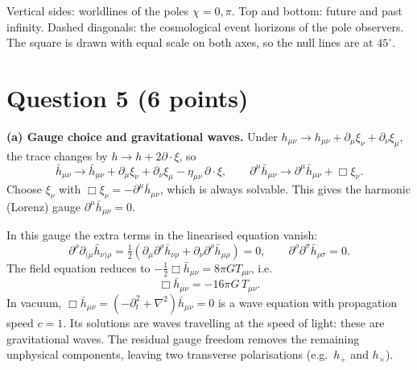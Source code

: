\documentclass[12pt]{article}
\newcommand{\bh}{\bar{h}}
\begin{document}
\begin{center}
\end{center}

\noindent Vertical sides: worldlines of the poles $\chi=0,\pi$. Top and bottom: future and past infinity. Dashed diagonals: the cosmological event horizons of the pole observers. The square is drawn with equal scale on both axes, so the null lines are at $45^\circ$.

\section*{Question 5 (6 points)}

\textbf{(a) Gauge choice and gravitational waves.} Under $h_{\mu\nu}\to h_{\mu\nu}+\partial_\mu\xi_\nu+\partial_\nu\xi_\mu$, the trace changes by $h\to h+2\partial\cdot\xi$, so
\[
\bh_{\mu\nu}\to\bh_{\mu\nu}+\partial_\mu\xi_\nu+\partial_\nu\xi_\mu-\eta_{\mu\nu}\,\partial\cdot\xi,
\qquad
\partial^\mu\bh_{\mu\nu}\to\partial^\mu\bh_{\mu\nu}+\Box\xi_\nu .
\]
Choose $\xi_\nu$ with $\Box\xi_\nu=-\partial^\mu\bh_{\mu\nu}$, which is always solvable. This gives the harmonic (Lorenz) gauge $\partial^\mu\bh_{\mu\nu}=0$.

In this gauge the extra terms in the linearised equation vanish:
\[
\partial^\rho\partial_{(\mu}\bh_{\nu)\rho}=\tfrac12\left(\partial_\mu\partial^\rho\bh_{\nu\rho}+\partial_\nu\partial^\rho\bh_{\mu\rho}\right)=0,
\qquad
\partial^\rho\partial^\sigma\bh_{\rho\sigma}=0 .
\]
The field equation reduces to $-\tfrac12\Box\bh_{\mu\nu}=8\pi G T_{\mu\nu}$, i.e.
\[
\Box\bh_{\mu\nu}=-16\pi G\,T_{\mu\nu}.
\]
In vacuum, $\Box\bar h_{\mu\nu}=(-\partial_t^2+\nabla^2)\bar h_{\mu\nu}=0$ is a wave equation with propagation speed $c=1$. Its solutions are waves travelling at the speed of light: these are gravitational waves. The residual gauge freedom removes the remaining unphysical components, leaving two transverse polarisations (e.g.\ $h_+$ and $h_\times$).
\end{document}
